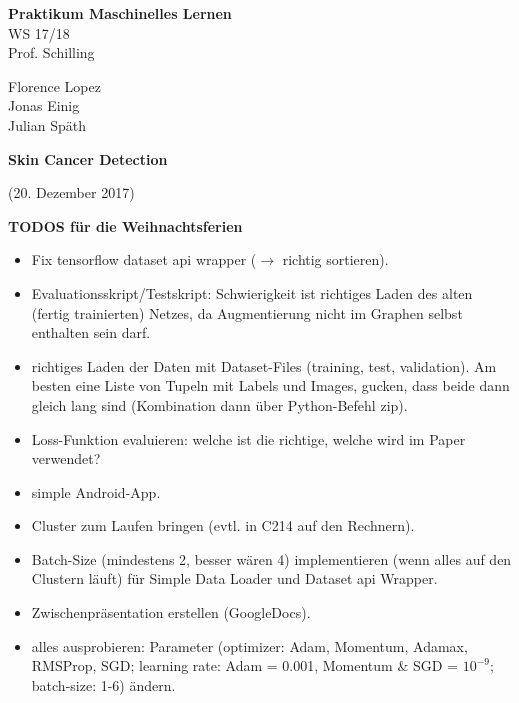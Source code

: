 \documentclass[%
   10pt,              %
   a4paper,           %
   DIV10,             %
]{scrartcl}%
\def\header#1#2#3#4#5#6{\pagestyle{empty}
\noindent
\begin{minipage}[t]{0.6\textwidth}
\begin{flushleft}
\textbf{#4}\\%
#6\\%
#2  %
\end{flushleft}
\end{minipage}
\begin{minipage}[t]{0.4\textwidth}
\begin{flushright}
\vspace*{0.2cm}
#5%
\end{flushright}
\end{minipage}

\begin{center}
{\Large\textbf{ #1}} %

{(#3)} %
\end{center}
}
\begin{document}
\header{Skin Cancer Detection}{Prof. Schilling}{20. Dezember 2017}{Praktikum Maschinelles Lernen}{Florence Lopez \\ Jonas Einig \\ Julian Späth}{WS 17/18}

\textbf{TODOS für die Weihnachtsferien }
\begin{itemize}
	\item Fix tensorflow dataset api wrapper ($\rightarrow$ richtig sortieren).
	\item Evaluationsskript/Testskript: Schwierigkeit ist richtiges Laden des alten (fertig trainierten) Netzes, da Augmentierung nicht im Graphen selbst enthalten sein darf. 
	\item richtiges Laden der Daten mit Dataset-Files (training, test, validation). Am besten eine Liste von Tupeln mit Labels und Images, gucken, dass beide dann gleich lang sind (Kombination dann über Python-Befehl zip).
	\item Loss-Funktion evaluieren: welche ist die richtige, welche wird im Paper verwendet? 
	\item simple Android-App.
	\item Cluster zum Laufen bringen (evtl. in C214 auf den Rechnern).
	\item Batch-Size (mindestens 2, besser wären 4) implementieren (wenn alles auf den Clustern läuft) für Simple Data Loader und Dataset api Wrapper. 
	\item Zwischenpräsentation erstellen (GoogleDocs). 
	\item alles ausprobieren: Parameter (optimizer: Adam, Momentum, Adamax, RMSProp, SGD; learning rate: Adam = 0.001, Momentum \& SGD = $10^{-9}$; batch-size: 1-6) ändern.
\end{itemize}
\end{document}

